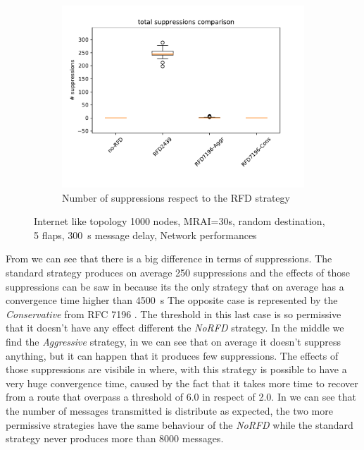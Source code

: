 \begin{figure}[h]
\begin{subfigure}[b]{0.325\textwidth}
         \label{fig:1000_RFD_MRAI30_mice_messages}
     \end{subfigure}
     \hfill
     \begin{subfigure}[b]{0.325\textwidth}
         \centering
         \includegraphics[width=\textwidth]{images/RFD/miceVSelephants/mice/cisco_1000MRAI30_rfd_comparison_suppressions_boxplot.pdf}
         \caption{Number of suppressions respect to the RFD strategy}
         \label{fig:1000_RFD_MRAI30_mice_suppressions}
     \end{subfigure}
		\caption{Internet like topology 1000 nodes, MRAI=30s, random destination, 5 flaps, \SI{300}{\second} message delay, Network performances}
        \label{fig:1000_RFD_MRAI30_mice}
\end{figure}

From  we can see that there is a
big difference in terms of suppressions.
The standard strategy produces on average \num{250} suppressions and the effects
of those suppressions can be saw in  because its
the only strategy that on average has a convergence time higher than \SI{4500}{\second}
The opposite case is represented by the \textit{Conservative} from \ac{RFC} 7196
\cite{rfc7196}.
The threshold in this last case is so permissive that  it doesn't have any effect
different the \textit{NoRFD} strategy.
In the middle we find the \textit{Aggressive} strategy, in 
we can see that on average it doesn't suppress anything, but it can happen that
it produces few suppressions.
The effects of those suppressions are visibile in 
where, with this strategy is possible to have a very huge convergence time, caused
by the fact that it takes more time to recover from a route that overpass a threshold
of \num{6.0} in respect of \num{2.0}.
In  we can see that the number of messages
transmitted is distribute as expected, the two more permissive strategies have the
same behaviour of the \textit{NoRFD} while the standard strategy never produces
more than \num{8000} messages.

